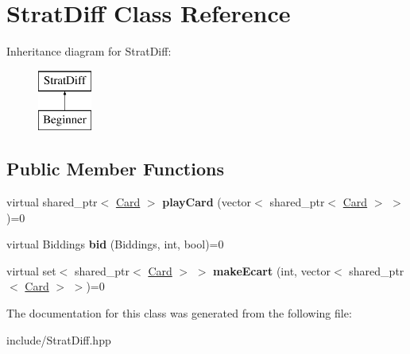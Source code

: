 \hypertarget{classStratDiff}{\section{\-Strat\-Diff \-Class \-Reference}
\label{classStratDiff}
}
\-Inheritance diagram for \-Strat\-Diff\-:\begin{figure}[H]
\begin{center}
\leavevmode
\includegraphics[height=2.000000cm]{classStratDiff}
\end{center}
\end{figure}
\subsection*{\-Public \-Member \-Functions}
\begin{DoxyCompactItemize}
\item 
\hypertarget{classStratDiff_aa45902d9040e928eda8993e94ccadb78}{virtual shared\-\_\-ptr$<$ \hyperlink{classCard}{\-Card} $>$ {\bfseries play\-Card} (vector$<$ shared\-\_\-ptr$<$ \hyperlink{classCard}{\-Card} $>$ $>$)=0}\label{classStratDiff_aa45902d9040e928eda8993e94ccadb78}

\item 
\hypertarget{classStratDiff_a71bde621a871ba2b3064326911538a32}{virtual \-Biddings {\bfseries bid} (\-Biddings, int, bool)=0}\label{classStratDiff_a71bde621a871ba2b3064326911538a32}

\item 
\hypertarget{classStratDiff_a7a126a234c4ef5991f594bef51a90623}{virtual set$<$ shared\-\_\-ptr$<$ \hyperlink{classCard}{\-Card} $>$ $>$ {\bfseries make\-Ecart} (int, vector$<$ shared\-\_\-ptr$<$ \hyperlink{classCard}{\-Card} $>$ $>$)=0}\label{classStratDiff_a7a126a234c4ef5991f594bef51a90623}

\end{DoxyCompactItemize}


\-The documentation for this class was generated from the following file\-:\begin{DoxyCompactItemize}
\item 
include/\-Strat\-Diff.\-hpp\end{DoxyCompactItemize}
